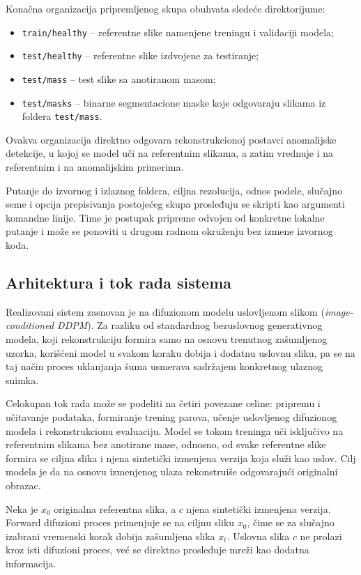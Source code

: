 \documentclass[10pt]{article}
\begin{document}
	Konačna organizacija pripremljenog skupa obuhvata sledeće direktorijume:
	\begin{itemize}
		\item \texttt{train/healthy} -- referentne slike namenjene treningu i validaciji modela;
		\item \texttt{test/healthy} -- referentne slike izdvojene za testiranje;
		\item \texttt{test/mass} -- test slike sa anotiranom masom;
		\item \texttt{test/masks} -- binarne segmentacione maske koje odgovaraju slikama iz foldera \texttt{test/mass}.
	\end{itemize}
	
	Ovakva organizacija direktno odgovara rekonstrukcionoj postavci anomalijske detekcije, u kojoj se model uči na referentnim slikama, a zatim vrednuje i na referentnim i na anomalijskim primerima.
	
	Putanje do izvornog i izlaznog foldera, ciljna rezolucija, odnos podele, slučajno seme i opcija prepisivanja postojećeg skupa prosleđuju se skripti kao argumenti komandne linije. Time je postupak pripreme odvojen od konkretne lokalne putanje i može se ponoviti u drugom radnom okruženju bez izmene izvornog koda. 
	\newpage
	
	\subsection{Arhitektura i tok rada sistema}
	
	Realizovani sistem zasnovan je na difuzionom modelu uslovljenom slikom (\textit{image-conditioned DDPM}). Za razliku od standardnog bezuslovnog generativnog modela, koji rekonstrukciju formira samo na osnovu trenutnog zašumljenog uzorka, korišćeni model u svakom koraku dobija i dodatnu uslovnu sliku, pa se na taj način proces uklanjanja šuma usmerava sadržajem konkretnog ulaznog snimka.
	
	Celokupan tok rada može se podeliti na četiri povezane celine: pripremu i učitavanje podataka, formiranje trening parova, učenje uslovljenog difuzionog modela i rekonstrukcionu evaluaciju. Model se tokom treninga uči isključivo na referentnim slikama bez anotirane mase, odnosno, od svake referentne slike formira se ciljna slika i njena sintetički izmenjena verzija koja služi kao uslov. Cilj modela je da na osnovu izmenjenog ulaza rekonstruiše odgovarajući originalni obrazac.
	
	Neka je $x_0$ originalna referentna slika, a $c$ njena sintetički izmenjena verzija. Forward difuzioni proces primenjuje se na ciljnu sliku $x_0$, čime se za slučajno izabrani vremenski korak dobija zašumljena slika $x_t$. Uslovna slika $c$ ne prolazi kroz isti difuzioni proces, već se direktno prosleđuje mreži kao dodatna informacija.
	
\end{document}
